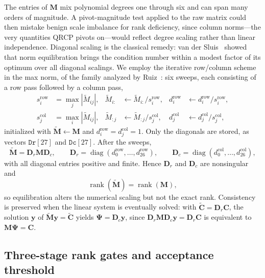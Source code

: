 \documentclass[11pt,a4paper]{article}
\theoremstyle{definition}
\newcommand{\Mt}{\widetilde{\bm M}}
\begin{document}
The entries of $\bm M$ mix polynomial degrees one through six and can
span many orders of magnitude. A pivot-magnitude test applied to the
raw matrix could then mistake benign scale imbalance for rank
deficiency, since column norms---the very quantities QRCP
pivots on---would reflect degree scaling rather than linear
independence. Diagonal scaling is the classical remedy: van der
Sluis~\cite{vandersluis1969} showed that norm equilibration brings the
condition number within a modest factor of its optimum over all
diagonal scalings. We employ the iterative row/column scheme in the
max norm, of the family analyzed by Ruiz~\cite{ruiz2001}: six sweeps,
each consisting of a row pass followed by a column pass,
\begin{equation}
\begin{aligned}
 s_i^{\mathrm{row}}&=\max_j|\widetilde M_{ij}|,&
 \widetilde M_{i:}&\leftarrow\widetilde M_{i:}/s_i^{\mathrm{row}},&
 d_i^{\mathrm{row}}&\leftarrow d_i^{\mathrm{row}}/s_i^{\mathrm{row}},\\
 s_j^{\mathrm{col}}&=\max_i|\widetilde M_{ij}|,&
 \widetilde M_{:j}&\leftarrow\widetilde M_{:j}/s_j^{\mathrm{col}},&
 d_j^{\mathrm{col}}&\leftarrow d_j^{\mathrm{col}}/s_j^{\mathrm{col}},
\end{aligned}
\label{eq:sweep}
\end{equation}
initialized with $\widetilde{\bm M}\leftarrow\bm M$ and
$d_i^{\mathrm{row}}=d_j^{\mathrm{col}}=1$. Only the diagonals are
stored, as vectors $\texttt{Dr}[27]$ and $\texttt{Dc}[27]$. After the
sweeps,
\begin{equation}
  \Mt=\bm D_r\bm M\bm D_c,
  \qquad
  \bm D_r=\operatorname{diag}(d_0^{\mathrm{row}},\dots,d_{26}^{\mathrm{row}}),
  \qquad
  \bm D_c=\operatorname{diag}(d_0^{\mathrm{col}},\dots,d_{26}^{\mathrm{col}}),
  \label{eq:equilibrated}
\end{equation}
with all diagonal entries positive and finite. Hence $\bm D_r$ and
$\bm D_c$ are nonsingular and
\begin{equation}
  \operatorname{rank}(\Mt)=\operatorname{rank}(\bm M),
\end{equation}
so equilibration alters the numerical scaling but not the exact rank.
Consistency is preserved when the linear system is eventually solved:
with $\widetilde{\bm C}=\bm D_r\bm C$, the solution $\bm y$ of
$\Mt\bm y=\widetilde{\bm C}$ yields $\bm\Psi=\bm D_c\bm y$, since
$\bm D_r\bm M\bm D_c\bm y=\bm D_r\bm C$ is equivalent to
$\bm M\bm\Psi=\bm C$.

\subsection{Three-stage rank gates and acceptance threshold}
\end{document}
